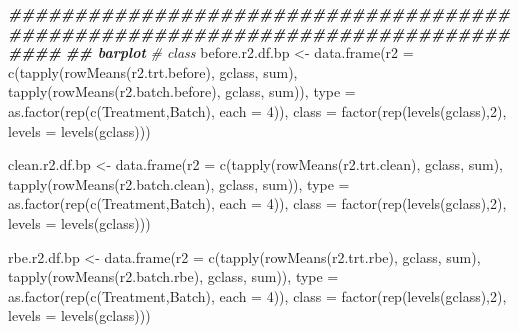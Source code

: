 \documentclass[
]{book}
\newenvironment{Shaded}{\begin{snugshade}}{\end{snugshade}}
\newcommand{\AttributeTok}[1]{\textcolor[rgb]{0.77,0.63,0.00}{#1}}
\newcommand{\CommentTok}[1]{\textcolor[rgb]{0.56,0.35,0.01}{\textit{#1}}}
\newcommand{\DecValTok}[1]{\textcolor[rgb]{0.00,0.00,0.81}{#1}}
\newcommand{\DocumentationTok}[1]{\textcolor[rgb]{0.56,0.35,0.01}{\textbf{\textit{#1}}}}
\newcommand{\FunctionTok}[1]{\textcolor[rgb]{0.00,0.00,0.00}{#1}}
\newcommand{\NormalTok}[1]{#1}
\newcommand{\OtherTok}[1]{\textcolor[rgb]{0.56,0.35,0.01}{#1}}
\newcommand{\StringTok}[1]{\textcolor[rgb]{0.31,0.60,0.02}{#1}}
\begin{document}
\begin{Shaded}
\begin{Highlighting}[]
\DocumentationTok{\#\#\#\#\#\#\#\#\#\#\#\#\#\#\#\#\#\#\#\#\#\#\#\#\#\#\#\#\#\#\#\#\#\#\#\#\#\#\#\#\#\#\#\#\#\#\#\#\#\#\#\#\#\#\#\#\#\#\#\#\#\#\#\#\#\#\#\#\#\#\#\#\#\#\#\#\#\#\#\#}
\DocumentationTok{\#\# barplot}
\CommentTok{\# class}
\NormalTok{before.r2.df.bp }\OtherTok{\textless{}{-}} 
  \FunctionTok{data.frame}\NormalTok{(}\AttributeTok{r2 =} \FunctionTok{c}\NormalTok{(}\FunctionTok{tapply}\NormalTok{(}\FunctionTok{rowMeans}\NormalTok{(r2.trt.before), gclass, sum),}
                    \FunctionTok{tapply}\NormalTok{(}\FunctionTok{rowMeans}\NormalTok{(r2.batch.before), gclass, sum)), }
             \AttributeTok{type =} \FunctionTok{as.factor}\NormalTok{(}\FunctionTok{rep}\NormalTok{(}\FunctionTok{c}\NormalTok{(}\StringTok{\textquotesingle{}Treatment\textquotesingle{}}\NormalTok{,}\StringTok{\textquotesingle{}Batch\textquotesingle{}}\NormalTok{), }\AttributeTok{each =} \DecValTok{4}\NormalTok{)),}
             \AttributeTok{class =} \FunctionTok{factor}\NormalTok{(}\FunctionTok{rep}\NormalTok{(}\FunctionTok{levels}\NormalTok{(gclass),}\DecValTok{2}\NormalTok{), }\AttributeTok{levels =} \FunctionTok{levels}\NormalTok{(gclass)))}

\NormalTok{clean.r2.df.bp }\OtherTok{\textless{}{-}} 
  \FunctionTok{data.frame}\NormalTok{(}\AttributeTok{r2 =} \FunctionTok{c}\NormalTok{(}\FunctionTok{tapply}\NormalTok{(}\FunctionTok{rowMeans}\NormalTok{(r2.trt.clean), gclass, sum),}
                    \FunctionTok{tapply}\NormalTok{(}\FunctionTok{rowMeans}\NormalTok{(r2.batch.clean), gclass, sum)), }
             \AttributeTok{type =} \FunctionTok{as.factor}\NormalTok{(}\FunctionTok{rep}\NormalTok{(}\FunctionTok{c}\NormalTok{(}\StringTok{\textquotesingle{}Treatment\textquotesingle{}}\NormalTok{,}\StringTok{\textquotesingle{}Batch\textquotesingle{}}\NormalTok{), }\AttributeTok{each =} \DecValTok{4}\NormalTok{)),}
             \AttributeTok{class =} \FunctionTok{factor}\NormalTok{(}\FunctionTok{rep}\NormalTok{(}\FunctionTok{levels}\NormalTok{(gclass),}\DecValTok{2}\NormalTok{), }\AttributeTok{levels =} \FunctionTok{levels}\NormalTok{(gclass)))}

\NormalTok{rbe.r2.df.bp }\OtherTok{\textless{}{-}} 
  \FunctionTok{data.frame}\NormalTok{(}\AttributeTok{r2 =} \FunctionTok{c}\NormalTok{(}\FunctionTok{tapply}\NormalTok{(}\FunctionTok{rowMeans}\NormalTok{(r2.trt.rbe), gclass, sum), }
                    \FunctionTok{tapply}\NormalTok{(}\FunctionTok{rowMeans}\NormalTok{(r2.batch.rbe), gclass, sum)), }
             \AttributeTok{type =} \FunctionTok{as.factor}\NormalTok{(}\FunctionTok{rep}\NormalTok{(}\FunctionTok{c}\NormalTok{(}\StringTok{\textquotesingle{}Treatment\textquotesingle{}}\NormalTok{,}\StringTok{\textquotesingle{}Batch\textquotesingle{}}\NormalTok{), }\AttributeTok{each =} \DecValTok{4}\NormalTok{)),}
             \AttributeTok{class =} \FunctionTok{factor}\NormalTok{(}\FunctionTok{rep}\NormalTok{(}\FunctionTok{levels}\NormalTok{(gclass),}\DecValTok{2}\NormalTok{), }\AttributeTok{levels =} \FunctionTok{levels}\NormalTok{(gclass)))}


\end{Highlighting}
\end{Shaded}
\end{document}
